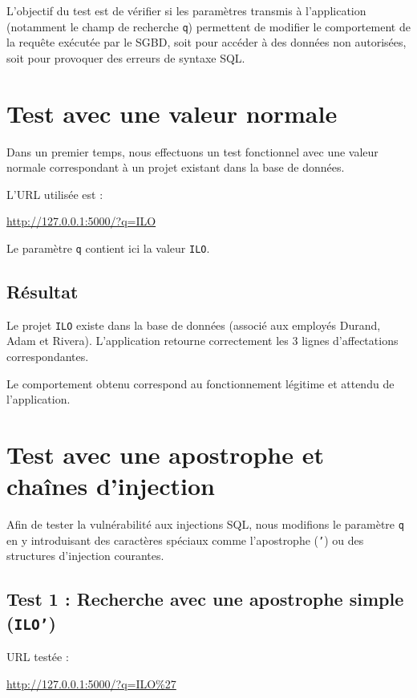 \documentclass[12pt,a4paper]{article}
\begin{document}
L'objectif du test est de vérifier si les paramètres transmis à l'application (notamment le champ de recherche \texttt{q}) permettent de modifier le comportement de la requête exécutée par le SGBD, soit pour accéder à des données non autorisées, soit pour provoquer des erreurs de syntaxe SQL.

\section{Test avec une valeur normale}
Dans un premier temps, nous effectuons un test fonctionnel avec une valeur normale correspondant à un projet existant dans la base de données.

L'URL utilisée est :
\begin{center}
    \url{http://127.0.0.1:5000/?q=ILO}
\end{center}

Le paramètre \texttt{q} contient ici la valeur \texttt{ILO}.

\subsection{Résultat}
Le projet \texttt{ILO} existe dans la base de données (associé aux employés Durand, Adam et Rivera). L'application retourne correctement les 3 lignes d'affectations correspondantes.

Le comportement obtenu correspond au fonctionnement légitime et attendu de l'application.

\section{Test avec une apostrophe et chaînes d'injection}
Afin de tester la vulnérabilité aux injections SQL, nous modifions le paramètre \texttt{q} en y introduisant des caractères spéciaux comme l'apostrophe (\texttt{'}) ou des structures d'injection courantes.

\subsection{Test 1 : Recherche avec une apostrophe simple (\texttt{ILO'})}
URL testée :
\begin{center}
    \url{http://127.0.0.1:5000/?q=ILO%27}
\end{center}
\end{document}
